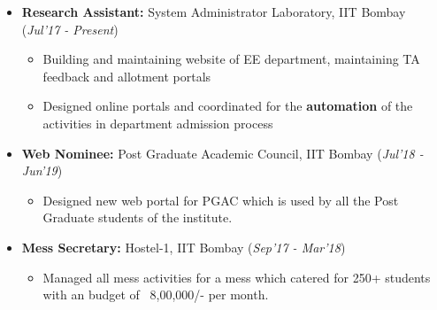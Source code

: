 \documentclass[10pt]{article}
\begin{document}
\colorbox{bl}{}

\begin{itemize}[leftmargin=0.4cm]
\vspace{-0.2cm}

\item \textbf {Research Assistant:} System Administrator Laboratory, IIT Bombay \hfill{(\textit{Jul'17 - Present})}\\[-0.7cm]
        \begin{itemize}
    \item Building and maintaining website of EE department, maintaining TA feedback and allotment portals\vspace{-0.1cm}
    \item Designed online portals and coordinated for the \textbf{automation} of the activities in department admission process
    \end{itemize}
    \vspace{-0.3cm}


\item \textbf{Web Nominee:} Post Graduate Academic Council, IIT Bombay \hfill{(\textit{Jul'18 - Jun'19})}\\[-0.65cm]
\begin{itemize}
\item Designed new web portal for PGAC which is used by all the Post Graduate students of the institute. \vspace{-0.25cm}

\end{itemize}

\item \textbf{Mess Secretary:
 }  Hostel-1, IIT Bombay   \hfill{(\textit{Sep'17 - Mar'18})}\\[-0.65cm]
 \begin{itemize}
\item Managed all mess activities for a mess which catered for 250+ students with an budget of ~8,00,000/- per month. \vspace{-0.25cm}

\end{itemize}

\vspace{-0.05cm}
\end{itemize}
\end{document}

